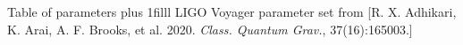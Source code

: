 \documentclass[12pt,xcolor=dvipsnames,aspectratio=169]{beamer}
\newcommand{\vframefill}{\vskip0pt plus 1filll}
\begin{document}
\begin{frame}[noframenumbering]{Table of parameters}
\centering
\vspace*{2cm}
\vframefill\centering
{\tiny LIGO Voyager parameter set from [R. X. Adhikari, K. Arai, A. F. Brooks, et al. 2020. \emph{Class. Quantum Grav.}, 37(16):165003.]}
\end{frame}
\end{document}
